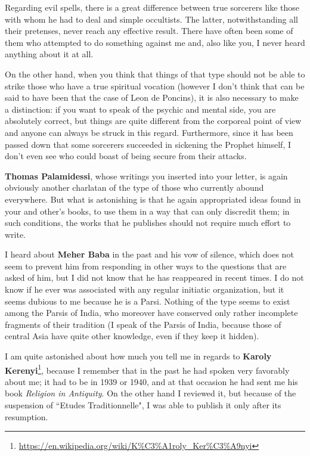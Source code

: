Regarding evil spells, there is a great difference between true sorcerers like those with whom he had to deal and simple occultists. The latter, notwithstanding all their pretenses, never reach any effective result. There have often been some of them who attempted to do something against me and, also like you, I never heard anything about it at all.

On the other hand, when you think that things of that type should not be able to strike those who have a true spiritual vocation (however I don't think that can be said to have been that the case of Leon de Poncins), it is also necessary to make a distinction: if you want to speak of the psychic and mental side, you are absolutely correct, but things are quite different from the corporeal point of view and anyone can always be struck in this regard. Furthermore, since it has been passed down that some sorcerers succeeded in sickening the Prophet himself, I don't even see who could boast of being secure from their attacks.

\textbf{Thomas Palamidessi}, whose writings you inserted into your letter, is again obviously another charlatan of the type of those who currently abound everywhere. But what is astonishing is that he again appropriated ideas found in your and other's books, to use them in a way that can only discredit them; in such conditions, the works that he publishes should not require much effort to write.

I heard about \textbf{Meher Baba} in the past and his vow of silence, which does not seem to prevent him from responding in other ways to the questions that are asked of him, but I did not know that he has reappeared in recent times. I do not know if he ever was associated with any regular initiatic organization, but it seems dubious to me because he is a Parsi. Nothing of the type seems to exist among the Parsis of India, who moreover have conserved only rather incomplete fragments of their tradition (I speak of the Parsis of India, because those of central Asia have quite other knowledge, even if they keep it hidden).

I am quite astonished about how much you tell me in regards to \textbf{Karoly Kerenyi}\footnote{\url{https://en.wikipedia.org/wiki/K\%C3\%A1roly_Ker\%C3\%A9nyi}}, because I remember that in the past he had spoken very favorably about me; it had to be in 1939 or 1940, and at that occasion he had sent me his book \emph{Religion in Antiquity}. On the other hand I reviewed it, but because of the suspension of ``Etudes Traditionnelle", I was able to publish it only after its resumption.


